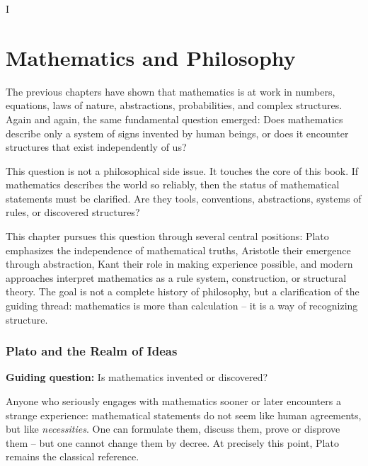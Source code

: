 
I\chapter{Mathematics and Philosophy}
\label{chap:VIII_philosophy}

The previous chapters have shown
that mathematics is at work in numbers, equations, laws of nature,
abstractions, probabilities, and complex structures.
Again and again, the same fundamental question emerged:
Does mathematics describe only a system of signs invented by human beings,
or does it encounter structures
that exist independently of us?

This question is not a philosophical side issue.
It touches the core of this book.
If mathematics describes the world so reliably,
then the status of mathematical statements must be clarified.
Are they tools,
conventions,
abstractions,
systems of rules,
or discovered structures?

This chapter pursues this question through several central positions:
Plato emphasizes the independence of mathematical truths,
Aristotle their emergence through abstraction,
Kant their role in making experience possible,
and modern approaches interpret mathematics as a rule system,
construction, or structural theory.
The goal is not a complete history of philosophy,
but a clarification of the guiding thread:
mathematics is more than calculation --
it is a way
of recognizing structure.


\subsection{Plato and the Realm of Ideas}
\label{sec:8.1}

\textbf{Guiding question:} Is mathematics invented or discovered?

\medskip

Anyone who seriously engages with mathematics
sooner or later encounters a strange experience:
mathematical statements do not seem like human agreements,
but like \emph{necessities}.
One can formulate them,
discuss them,
prove or disprove them --
but one cannot change them by decree.
At precisely this point, Plato remains the classical reference.

